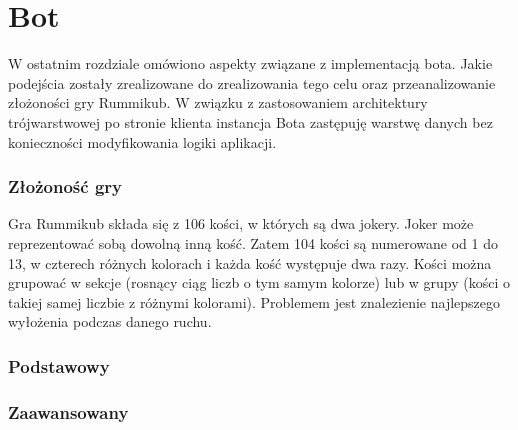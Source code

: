 \chapter{Bot}
\thispagestyle{chapterBeginStyle}

W ostatnim rozdziale omówiono aspekty związane z implementacją bota. Jakie podejścia zostały zrealizowane do zrealizowania tego celu oraz przeanalizowanie złożoności gry Rummikub. W związku z zastosowaniem architektury trójwarstwowej po stronie klienta instancja Bota zastępuję warstwę danych bez konieczności modyfikowania logiki aplikacji.

\subsection{Złożoność gry}

Gra Rummikub składa się z 106 kości, w których są dwa jokery. Joker może reprezentować sobą dowolną inną kość. Zatem 104 kości są numerowane od 1 do 13, w czterech różnych kolorach i każda kość występuje dwa razy. Kości można grupować w sekcje (rosnący ciąg liczb o tym samym kolorze) lub w grupy (kości o takiej samej liczbie z różnymi kolorami). Problemem jest znalezienie najlepszego wyłożenia podczas danego ruchu. \\



\subsection{Podstawowy}



\subsection{Zaawansowany}



